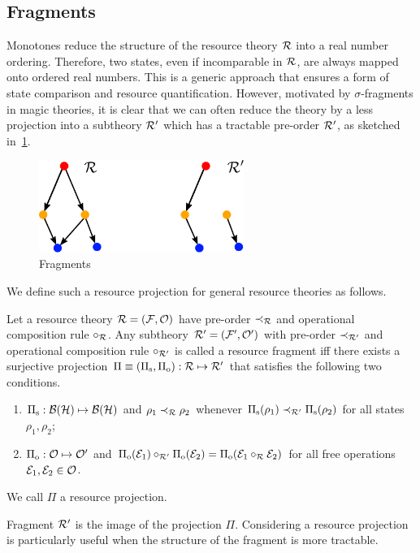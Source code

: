 \subsection{Fragments}

Monotones reduce the structure of the resource theory $\mathcal{R}$ into a real number ordering.
Therefore, two states, even if incomparable in $\mathcal{R}$, are always mapped onto ordered real numbers.
This is a generic approach that ensures a form of state comparison and resource quantification.
However, motivated by $\sigma$-fragments in magic theories, it is clear that we can often reduce the theory by a less  projection into a subtheory $\mathcal{R}'$ which has a tractable pre-order $\mathcal{R}'$, as sketched in~\cref{fig:fragments}.
\begin{figure}
    \centering
    \includegraphics[height=3cm]{sections/major/fragments.pdf}
    \caption{Fragments 
    }
    \label{fig:fragments}
\end{figure}
We define such a resource projection for general resource theories as follows.
\begin{definition}\label{def:fragment}
    Let a resource theory $\mathcal{R} = (\mathcal{F}, \mathcal{O})$ have pre-order $\prec_{\mathcal{R}}$ and operational composition rule $\circ_{\mathcal{R}}$. 
    Any subtheory $\mathcal{R}' = (\mathcal{F}', \mathcal{O}')$ with pre-order $\prec_{\mathcal{R}'}$ and operational composition rule $\circ_{\mathcal{R}'}$ is called a resource fragment iff there exists a surjective projection $\Pi \equiv (\Pi_{\rm{s}}, \Pi_{\rm{o}}): \mathcal{R} \mapsto \mathcal{R}'$ that satisfies the following two conditions.
    \begin{enumerate}
        \item $\Pi_{\rm{s}}: \mathcal{B}(\mathcal{H}) \mapsto \mathcal{B}(\mathcal{H})$ and $\rho_1 \prec_{\mathcal{R}} \rho_2$ whenever $\Pi_{\rm{s}}(\rho_1) \prec_{\mathcal{R}'} \Pi_{\rm{s}}(\rho_2)$ for all states $\rho_1, \rho_2$;
        \item $\Pi_{\rm{o}}: \mathcal{O} \mapsto \mathcal{O}'$ and $\Pi_{\rm{o}}(\mathcal{E}_1) \circ_{\mathcal{R}'} \Pi_{\rm{o}}(\mathcal{E}_2) = \Pi_{\rm{o}}(\mathcal{E}_1 \circ_{\mathcal{R}} \mathcal{E}_2)$ for all free operations $\mathcal{E}_1, \mathcal{E}_2 \in \mathcal{O}$. 
    \end{enumerate}
    We call $\Pi$ a resource projection.
\end{definition}
Fragment $\mathcal{R}'$ is the image of the projection $\Pi$.
Considering a resource projection is particularly useful when the structure of the fragment is more tractable.

